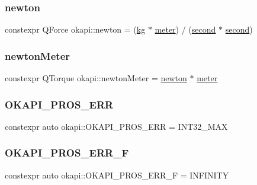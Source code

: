 \subsubsection{\texorpdfstring{newton}{newton}}
{\footnotesize\ttfamily constexpr Q\+Force okapi\+::newton = (\mbox{\hyperlink{namespaceokapi_afcc67eb55c70e21f82cbee49aa19d05a}{kg}} $\ast$ \mbox{\hyperlink{namespaceokapi_a59563b3d4b18633f1c8d852e2932d1db}{meter}}) / (\mbox{\hyperlink{namespaceokapi_ae9ece1daf9cd9f6d3a597cc5c0dc7b40}{second}} $\ast$ \mbox{\hyperlink{namespaceokapi_ae9ece1daf9cd9f6d3a597cc5c0dc7b40}{second}})}

\mbox{\label{namespaceokapi_a3d685da47b39ff4bdf1936c2e12076ee}} 
\subsubsection{\texorpdfstring{newtonMeter}{newtonMeter}}
{\footnotesize\ttfamily constexpr Q\+Torque okapi\+::newton\+Meter = \mbox{\hyperlink{namespaceokapi_a66d91011ac90f25dc5e518f092cc5a74}{newton}} $\ast$ \mbox{\hyperlink{namespaceokapi_a59563b3d4b18633f1c8d852e2932d1db}{meter}}}

\mbox{\label{namespaceokapi_a18913fb1230fd1353366981f1f78335c}} 
\subsubsection{\texorpdfstring{OKAPI\_PROS\_ERR}{OKAPI\_PROS\_ERR}}
{\footnotesize\ttfamily constexpr auto okapi\+::\+O\+K\+A\+P\+I\+\_\+\+P\+R\+O\+S\+\_\+\+E\+RR = I\+N\+T32\+\_\+\+M\+AX\hspace{0.3cm}{\ttfamily [static]}}

\mbox{\label{namespaceokapi_a0f2b0da948b0276b354ca035af11380e}} 
\subsubsection{\texorpdfstring{OKAPI\_PROS\_ERR\_F}{OKAPI\_PROS\_ERR\_F}}
{\footnotesize\ttfamily constexpr auto okapi\+::\+O\+K\+A\+P\+I\+\_\+\+P\+R\+O\+S\+\_\+\+E\+R\+R\+\_\+F = I\+N\+F\+I\+N\+I\+TY\hspace{0.3cm}{\ttfamily [static]}}

